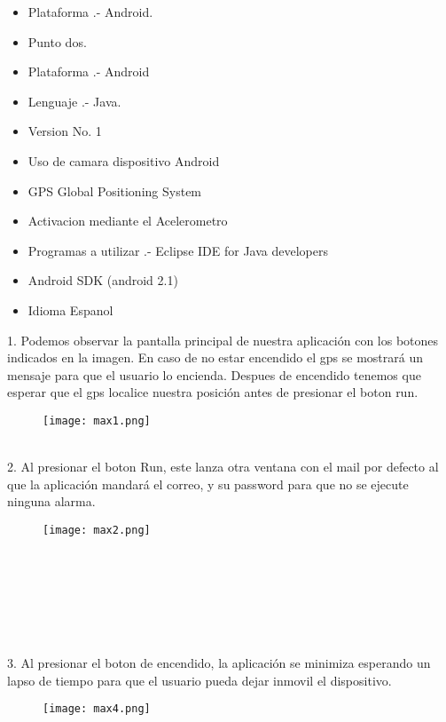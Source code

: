 \documentclass[12pt,letterpaper]{article}
\begin{document}
   \begin{itemize}
   
   \item Plataforma .- Android.
   \item Punto dos.
   \item Plataforma .- Android
   \item Lenguaje .- Java.
   \item Version No. 1
   \item Uso de camara dispositivo Android
   \item GPS Global Positioning System
   \item Activacion mediante el Acelerometro
   \item Programas a utilizar .- Eclipse IDE for Java developers
   \item Android SDK (android 2.1)
   \item Idioma{\tiny } Espanol
   
   
   \end{itemize}
1. Podemos observar la pantalla principal de nuestra aplicación con los botones indicados en la imagen. En caso de no estar encendido el gps se mostrará un mensaje para que el usuario lo encienda. Despues de encendido tenemos que esperar que el gps localice nuestra posición antes de presionar el boton run.
\begin{figure}[h]
\begin{center}
\texttt{[image: max1.png]}\\
\end{center}
\end{figure}\\
2. Al presionar el boton Run, este lanza otra ventana con el mail por defecto al que la  aplicación mandará el correo, y su password  para que no se ejecute ninguna alarma.
\begin{figure}[h]
\begin{center}
\texttt{[image: max2.png]}\\
\end{center}
\end{figure}\\\\\\\\\\\\
3. Al presionar el boton de encendido, la aplicación se minimiza esperando un lapso de tiempo para que el usuario pueda dejar inmovil el dispositivo.
\begin{figure}[h]
\begin{center}
\texttt{[image: max4.png]}\\
\end{center}
\end{figure}\\
\end{document}
